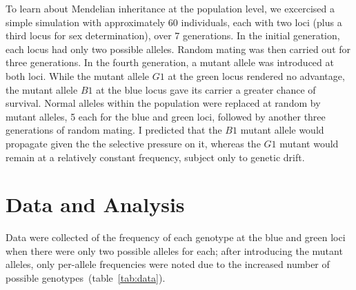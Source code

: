 \documentclass{article}
\begin{document}
        To learn about Mendelian inheritance at the population level, we
            excercised a simple simulation with approximately 60 individuals,
            each with two loci (plus a third locus for sex determination),
            over 7 generations.
        In the initial generation, each locus had only two possible alleles.
        Random mating was then carried out for three generations.
        In the fourth generation, a mutant allele was introduced at both loci.
        While the mutant allele $G1$ at the green locus rendered no advantage,
            the mutant allele $B1$ at the blue locus gave its carrier a greater
            chance of survival.
        Normal alleles within the population were replaced at random by mutant
            alleles, 5 each for the blue and green loci, followed by another
            three generations of random mating.
        I predicted that the $B1$ mutant allele would propagate given the
            the selective pressure on it, whereas the $G1$ mutant would remain
            at a relatively constant frequency, subject only to genetic drift.

    \section*{Data and Analysis}

    Data were collected of the frequency of each genotype at the blue and green
        loci when there were only two possible alleles for each; after
        introducing the mutant alleles, only per-allele frequencies were
        noted due to the increased number of possible
        genotypes~(table~\ref{tab:data}).
\end{document}
